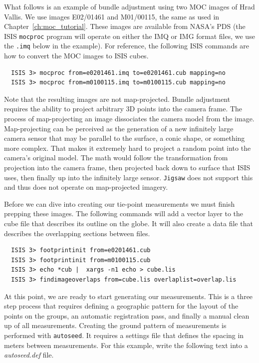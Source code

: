 What follows is an example of bundle adjustment using two \ac{MOC}
images of Hrad Vallis. We use images E02/01461 and M01/00115, the same
as used in Chapter~\ref{ch:moc_tutorial}. These images are available from
NASA's \ac{PDS} (the \ac{ISIS} \texttt{mocproc} program will operate
on either the IMQ or IMG format files, we use the \texttt{.imq} below
in the example).  For reference, the following \ac{ISIS} commands are
how to convert the \ac{MOC} images to \ac{ISIS} cubes.

\begin{verbatim}
  ISIS 3> mocproc from=e0201461.imq to=e0201461.cub mapping=no
  ISIS 3> mocproc from=m0100115.imq to=m0100115.cub mapping=no
\end{verbatim}

Note that the resulting images are not map-projected. Bundle
adjustment requires the ability to project arbitrary 3D points into
the camera frame. The process of map-projecting an image dissociates
the camera model from the image. Map-projecting can be perceived as
the generation of a new infinitely large camera sensor that may be
parallel to the surface, a conic shape, or something more
complex. That makes it extremely hard to project a random point into
the camera's original model. The math would follow the transformation
from projection into the camera frame, then projected back down to
surface that ISIS uses, then finally up into the infinitely large
sensor. \texttt{Jigsaw} does not support this and thus does not
operate on map-projected imagery.

Before we can dive into creating our tie-point measurements we must
finish prepping these images. The following commands will add a vector
layer to the cube file that describes its outline on the globe. It
will also create a data file that describes the overlapping sections
between files.

\begin{verbatim}
  ISIS 3> footprintinit from=e0201461.cub
  ISIS 3> footprintinit from=m0100115.cub
  ISIS 3> echo *cub |  xargs -n1 echo > cube.lis
  ISIS 3> findimageoverlaps from=cube.lis overlaplist=overlap.lis
\end{verbatim}

At this point, we are ready to start generating our measurements. This
is a three step process that requires defining a geographic pattern
for the layout of the points on the groups, an automatic registration
pass, and finally a manual clean up of all measurements. Creating the
ground pattern of measurements is performed with \texttt{autoseed}. It
requires a settings file that defines the spacing in meters between
measurements. For this example, write the following text into a
\textit{autoseed.def} file.

